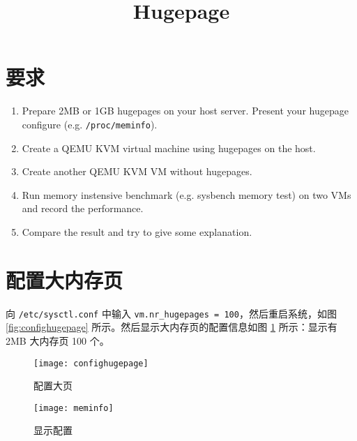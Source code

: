 

    \title{Hugepage}
    \maketitle
    \tableofcontents
    \section{要求}
    \begin{enumerate}[(1)]
        \item Prepare 2MB or 1GB hugepages on your host server. Present your hugepage configure (e.g. \verb"/proc/meminfo").

        \item Create a QEMU KVM virtual machine using hugepages on the host.
     
        \item Create another QEMU KVM VM without hugepages.
     
        \item Run memory instensive benchmark (e.g. sysbench memory test) on two VMs and record the performance.
     
        \item Compare the result and try to give some explanation.
    \end{enumerate}

    \section{配置大内存页}

    向 \verb"/etc/sysctl.conf" 中输入 \texttt{vm.nr\_hugepages = 100}，然后重启系统，如图 \ref{fig:confighugepage} 所示。然后显示大内存页的配置信息如图 \ref{fig:meminfo} 所示：显示有 2MB 大内存页 100 个。

    \begin{figure}[H]
        \centering
        \begin{minipage}{0.48\textwidth}
            \centering
            \texttt{[image: confighugepage]}
            \caption{配置大页}\label{fig:confighugepage}
        \end{minipage}
        \begin{minipage}{0.48\textwidth}
            \centering
            \texttt{[image: meminfo]}
            \caption{显示配置}\label{fig:meminfo}
        \end{minipage}
    \end{figure}

